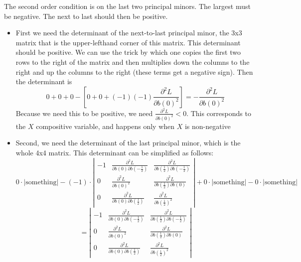 \documentclass[12pt]{article}
\begin{document}
The second order condition is on the last two principal minors. The largest must be negative. The next to last should then be positive.
\begin{itemize}
	\item First we need the determinant of the next-to-last principal minor, the 3x3 matrix that is the upper-lefthand corner of this matrix. This determinant should be positive. We can use the trick by which one copies the first two rows to the right of the matrix and then multiplies down the columns to the right and up the columns to the right (these terms get a negative sign). Then the determinant is
	  \[
		  0 + 0 + 0 - \left[0 + 0 + (-1)(-1)\frac{\partial^2 L}{\partial b(0)^2} \right] = - \frac{\partial^2 L}{\partial b(0)^2}
		\]
		Because we need this to be positive, we need $\frac{\partial^2 L}{\partial b(0)^2} < 0$. This corresponds to the $X$ compositive variable, and happens only when $X$ is non-negative
	\item Second, we need the determinant of the last principal minor, which is the whole 4x4 matrix. This determinant can be simplified as follows:
		\[
		  0 \cdot \left|\text{something} \right| - (-1)\cdot 
			\left|\begin{array}{ccc}
				- 1 & \frac{\partial^2 L}{\partial b(0)\partial b\left(-\frac{1}{2}\right)} & \frac{\partial^2 L}{\partial b\left(\frac{1}{2}\right)\partial b\left(-\frac{1}{2}\right)}  \\
			0 & \frac{\partial^2 L}{\partial b(0)^2} & \frac{\partial^2 L}{\partial b\left(\frac{1}{2}\right)\partial b\left(0\right)} \\
			0 & \frac{\partial^2 L}{\partial b(0) \partial b\left(\frac{1}{2}\right)} & \frac{\partial^2 L}{\partial b\left(\frac{1}{2}\right)^2}
			\end{array} \right| + 0 \cdot \left|\text{something} \right| - 0 \cdot \left|\text{something} \right|
		\]
		\[ 
			=
			\left|\begin{array}{ccc}
				- 1 & \frac{\partial^2 L}{\partial b(0)\partial b\left(-\frac{1}{2}\right)} & \frac{\partial^2 L}{\partial b\left(\frac{1}{2}\right)\partial b\left(-\frac{1}{2}\right)}  \\
			0 & \frac{\partial^2 L}{\partial b(0)^2} & \frac{\partial^2 L}{\partial b\left(\frac{1}{2}\right)\partial b\left(0\right)} \\
			0 & \frac{\partial^2 L}{\partial b(0) \partial b\left(\frac{1}{2}\right)} & \frac{\partial^2 L}{\partial b\left(\frac{1}{2}\right)^2}
			\end{array} \right|
\]
\end{itemize}
\end{document}
